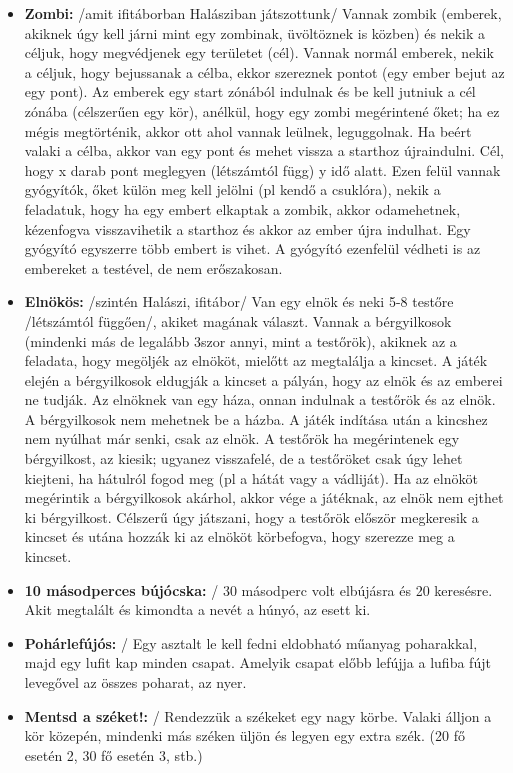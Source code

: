 \documentclass[a4paper, 12pt, twoside, openright]{article}
\begin{document}
\begin{itemize}
\item \textbf{Zombi:} /amit ifitáborban Halásziban játszottunk/ Vannak zombik (emberek, akiknek úgy kell járni mint egy zombinak, üvöltöznek is közben) és nekik a céljuk, hogy megvédjenek egy területet (cél). Vannak normál emberek, nekik a céljuk, hogy bejussanak a célba, ekkor szereznek pontot (egy ember bejut az egy pont). Az emberek egy start zónából indulnak és be kell jutniuk a cél zónába (célszerűen egy kör), anélkül, hogy egy zombi megérintené őket; ha ez mégis megtörténik, akkor ott ahol vannak leülnek, leguggolnak. Ha beért valaki a célba, akkor van egy pont és mehet vissza a starthoz újraindulni. Cél, hogy x darab pont meglegyen (létszámtól függ) y idő alatt. Ezen felül vannak gyógyítók, őket külön meg kell jelölni (pl kendő a csuklóra), nekik a feladatuk, hogy ha egy embert elkaptak a zombik, akkor odamehetnek, kézenfogva visszavihetik a starthoz és akkor az ember újra indulhat. Egy gyógyító egyszerre több embert is vihet. A gyógyító ezenfelül védheti is az embereket a testével, de nem erőszakosan.

\item \textbf{Elnökös:} /szintén Halászi, ifitábor/ Van egy elnök és neki 5-8 testőre /létszámtól függően/, akiket magának választ. Vannak a bérgyilkosok (mindenki más de legalább 3szor annyi, mint a testőrök), akiknek az a feladata, hogy megöljék az elnököt, mielőtt az megtalálja a kincset. A játék elején a bérgyilkosok eldugják a kincset a pályán, hogy az elnök és az emberei ne tudják. Az elnöknek van egy háza, onnan indulnak a testőrök és az elnök. A bérgyilkosok nem mehetnek be a házba. A játék indítása után a kincshez nem nyúlhat már senki, csak az elnök. A testőrök ha megérintenek egy bérgyilkost, az kiesik; ugyanez visszafelé, de a testőröket csak úgy lehet kiejteni, ha hátulról fogod meg (pl a hátát vagy a vádliját). Ha az elnököt megérintik a bérgyilkosok akárhol, akkor vége a játéknak, az elnök nem ejthet ki bérgyilkost. Célszerű úgy játszani, hogy a testőrök először megkeresik a kincset és utána hozzák ki az elnököt körbefogva, hogy szerezze meg a kincset.

\item \textbf{10 másodperces bújócska:} / 30 másodperc volt elbújásra és 20 keresésre. Akit megtalált és kimondta a nevét a húnyó, az esett ki.

\item \textbf{Pohárlefújós:} / Egy asztalt le kell fedni eldobható műanyag poharakkal, majd egy lufit kap minden csapat. Amelyik csapat előbb lefújja a lufiba fújt levegővel az összes poharat, az nyer.
\item \textbf{Mentsd a széket!:} / Rendezzük a székeket egy nagy körbe. Valaki álljon a kör közepén, mindenki más széken üljön és legyen egy extra szék. (20 fő esetén 2, 30 fő esetén 3, stb.)


\end{itemize}
\end{document}
